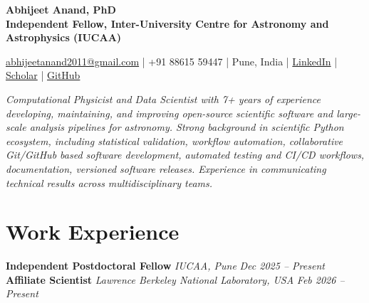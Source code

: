\documentclass[a4paper,10pt]{article}
\begin{document}
\begin{center}
    {\huge \textbf{Abhijeet Anand, PhD}} \\
    {\normalsize \vspace{2mm}
    \textbf{Independent Fellow, Inter-University Centre for Astronomy and Astrophysics (IUCAA)}}
    \vspace{-1mm}
    \begin{center}
    \normalfont
    \href{mailto:abhijeetanand2011@gmail.com}{abhijeetanand2011@gmail.com} \quad | \quad
    +91 88615 59447 \quad | \quad Pune, India \quad | \quad
    \href{https://www.linkedin.com/in/abhijeet-anand-iisc}{LinkedIn} \quad | \quad
    \href{https://scholar.google.com/citations?hl=en&user=MfOuq1IAAAAJ}{Scholar} \quad | \quad
    \href{https://github.com/abhi0395}{GitHub}
    \end{center}
\end{center}


\vspace*{-1.5mm}
\begin{center}
\textit{Computational Physicist and Data Scientist with 7+ years of experience developing, maintaining, and improving open-source scientific software and large-scale analysis pipelines for astronomy. Strong background in scientific Python ecosystem, including statistical validation, workflow automation, collaborative Git/GitHub based software development, automated testing and CI/CD workflows, documentation, versioned software releases. Experience in communicating technical results across multidisciplinary teams.}
\end{center}

\vspace*{-2mm}

\section*{Work Experience}

\textcolor{sectionblue}{\textbf{Independent Postdoctoral Fellow}} \hfill
\textcolor{sectionblue}{\textit{IUCAA, Pune}} \hfill
\textcolor{sectionblue}{\textit{Dec 2025 -- Present}}\\
\textcolor{sectionblue}{\textbf{Affiliate Scientist}} \hfill
\textcolor{sectionblue}{\textit{Lawrence Berkeley National Laboratory, USA}} \hfill
\textcolor{sectionblue}{\textit{Feb 2026 -- Present}}
\end{document}
